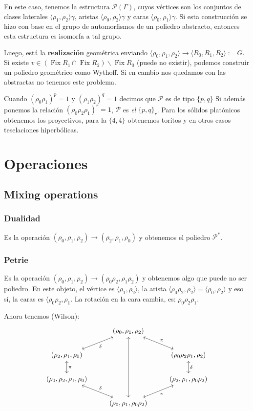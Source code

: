 \documentclass[spanish]{article}
\theoremstyle{definition}
\newcommand{\p}{\mathcal{P}}
\DeclareMathOperator{\Fix}{Fix}
\begin{document}
En este caso, tenemos la estructura $\p(\Gamma)$, cuyos vértices son los conjuntos de clases laterales $\langle\rho_1,\rho_2\rangle\gamma$, aristas $\langle\rho_0,\rho_2\rangle\gamma$ y caras $\langle\rho_0,\rho_1\rangle\gamma$. Si esta construcción se hizo con base en el grupo de automorfismos de un poliedro abstracto, entonces esta estructura es isomorfa a tal grupo.

Luego, está la \textbf{realización} geométrica enviando $\langle\rho_0,\rho_1,\rho_2\rangle\to\langle R_0,R_1,R_2\rangle:=G$. Si existe $v\in(\Fix R_1\cap\Fix R_2)\backslash\Fix R_0$ (puede no existir), podemos construir un poliedro geométrico como Wythoff. Si en cambio nos quedamos con las abstractas no tenemos este problema.

Cuando $(\rho_0\rho_1)^p=1$ y $(\rho_1\rho_2)^q=1$ decimos que $\p$ es de tipo $\{p,q\}$ Si además ponemos la relación $(\rho_0\rho_2\rho_1)^r=1$, $\p$ es \textit{el} $\{p,q\}_r$. Para los sólidos platónicos obtenemos los proyectivos, para la $\{4,4\}$ obtenemos toritos y en otros casos teselaciones hiperbólicas.
\section{Operaciones}
\subsection{Mixing operations}
\subsubsection{Dualidad}
Es la operación $(\rho_0,\rho_1,\rho_2)\to(\rho_2,\rho_1,\rho_0)$ y obtenemos el poliedro $\p^*$.
\subsubsection{Petrie}
Es la operación $(\rho_0,\rho_1,\rho_2)\to(\rho_0\rho_2,\rho_1\rho_2)$ y obtenemos algo que puede no ser poliedro. En este objeto, el vértice es $\langle\rho_1,\rho_2\rangle$, la arista $\langle\rho_0\rho_2,\rho_2\rangle=\langle\rho_0,\rho_2\rangle$ y eso sí, la caras es $\langle\rho_0\rho_2,\rho_1$. La rotación en la cara cambia, es: $\rho_0\rho_2\rho_1$.

Ahora tenemos (Wilson):
\[\begin{tikzcd}
	&(\rho_0,\rho_1,\rho_2)\arrow[dl,leftrightarrow,"\delta"]\arrow[rd,leftrightarrow,"\pi"]\\
	(\rho_2,\rho_1,\rho_0)\arrow[d,leftrightarrow,"\pi"]&&(\rho_0\rho_2\rho_1,\rho_2)\arrow[d,leftrightarrow,"\delta"]\\
	(\rho_0,\rho_2,\rho_1,\rho_0)\arrow[dr,leftrightarrow,"\delta"]&&(\rho_2,\rho_1,\rho_0\rho_2)\arrow[dl,leftrightarrow,"\pi"]\\
	&(\rho_0,\rho_1,\rho_0\rho_2)\arrow[uuu,leftrightarrow]
\end{tikzcd}\]
\end{document}
